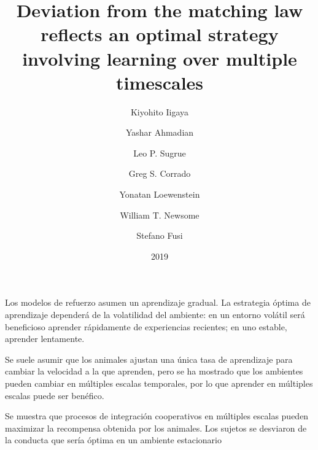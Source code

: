\documentclass[a4paper,12pt]{article}
\title{Deviation from the matching law reflects an optimal strategy involving learning over multiple timescales}
\author{Kiyohito Iigaya \and Yashar Ahmadian \and Leo P. Sugrue \and Greg S. Corrado \and Yonatan Loewenstein \and William T. Newsome \and Stefano Fusi}
\date{2019}
\begin{document}
{\scshape\bfseries \maketitle}

Los modelos de refuerzo asumen un aprendizaje gradual. La estrategia óptima de aprendizaje dependerá de la volatilidad del ambiente: en un entorno volátil será beneficioso aprender rápidamente de experiencias recientes; en uno estable, aprender lentamente.

Se suele asumir que los animales ajustan una única tasa de aprendizaje para cambiar la velocidad a la que aprenden, pero se ha mostrado que los ambientes pueden cambiar en múltiples escalas temporales, por lo que aprender en múltiples escalas puede ser benéfico.

Se muestra que procesos de integración cooperativos en múltiples escalas pueden maximizar la recompensa obtenida por los animales. Los sujetos se desviaron de la conducta que sería óptima en un ambiente estacionario
\end{document}
